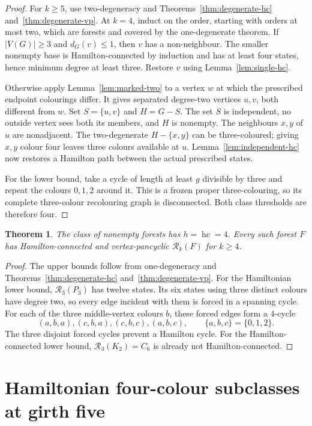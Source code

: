 \documentclass[11pt]{article}
\newtheorem{theorem}{Theorem}[section]
\theoremstyle{remark}
\newcommand{\R}{\mathcal R}
\newcommand{\Rk}{\mathcal R_k}
\newcommand{\hc}{\operatorname{hc}}
\numberwithin{equation}{section}
\numberwithin{table}{section}
\begin{document}
\begin{proof}
For $k\ge5$, use two-degeneracy and
Theorems~\ref{thm:degenerate-hc} and~\ref{thm:degenerate-vp}.
At $k=4$, induct on the order, starting with orders at most two,
which are forests and covered by the one-degenerate theorem.
If $|V(G)|\ge3$ and $d_G(v)\le1$, then $v$ has a non-neighbour.
The smaller nonempty base is Hamilton-connected by induction and has
at least four states, hence minimum degree at least three.  Restore
$v$ using Lemma~\ref{lem:single-hc}.

Otherwise apply Lemma~\ref{lem:marked-two} to a vertex $w$ at which
the prescribed endpoint colourings differ.  It gives separated
degree-two vertices $u,v$, both different from $w$.  Set
$S=\{u,v\}$ and $H=G-S$.  The set $S$ is independent, no outside
vertex sees both its members, and $H$ is nonempty.  The neighbours
$x,y$ of $u$ are nonadjacent.  The two-degenerate $H-\{x,y\}$
can be three-coloured; giving $x,y$ colour four leaves three colours
available at $u$.  Lemma~\ref{lem:independent-hc} now restores a
Hamilton path between the actual prescribed states.

For the lower bound, take a cycle of length at least $g$ divisible by
three and repeat the colours $0,1,2$ around it.  This is a frozen
proper three-colouring, so its complete three-colour recolouring graph
is disconnected.  Both class thresholds are therefore four.
\end{proof}

\begin{theorem}
\label{thm:forest-hc}
The class of nonempty forests has $h=\hc=4$.  Every such forest
$F$ has Hamilton-connected and vertex-pancyclic $\Rk(F)$ for
$k\ge4$.
\end{theorem}

\begin{proof}
The upper bounds follow from one-degeneracy and
Theorems~\ref{thm:degenerate-hc} and~\ref{thm:degenerate-vp}.
For the Hamiltonian lower bound, $\R_3(P_3)$ has twelve
states.  Its six states using three distinct colours have degree two,
so every edge incident with them is forced in a spanning cycle.
For each of the three middle-vertex colours $b$, these forced edges
form a $4$-cycle
\[
 (a,b,a),(c,b,a),(c,b,c),(a,b,c),
 \qquad \{a,b,c\}=\{0,1,2\}.
\]
The three disjoint forced cycles prevent a Hamilton cycle.  For the
Hamilton-connected lower bound, $\R_3(K_2)=C_6$
is already not Hamilton-connected.
\end{proof}

\section{Hamiltonian four-colour subclasses at girth five}
\label{sec:four-colour-subclasses}
\end{document}
